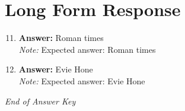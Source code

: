 \documentclass[12pt]{article}
\begin{document}
\section*{Long Form Response}
\begin{enumerate}[label=\arabic*.]
\setcounter{enumi}{10}
\item \textbf{Answer:} Roman times
\\ \textit{Note:} Expected answer: Roman times
\item \textbf{Answer:} Evie Hone
\\ \textit{Note:} Expected answer: Evie Hone
\end{enumerate}

\vfill
\noindent\textit{End of Answer Key}
\end{document}

